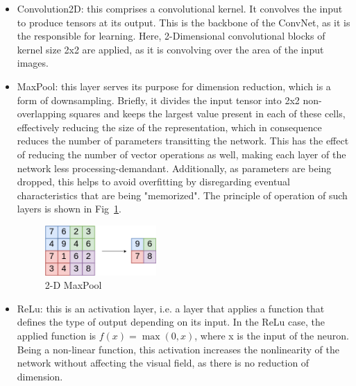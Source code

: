 \begin{itemize}
    \item Convolution2D: this comprises a convolutional kernel. It convolves the input to produce tensors at its output. This is the backbone of the \ac{ConvNet}, as it is the responsible for learning. Here, 2-Dimensional convolutional blocks of kernel size 2x2 are applied, as it is convolving over the area of the input images.
    \item MaxPool: this layer serves its purpose for dimension reduction, which is a form of downsampling. Briefly, it divides the input tensor into 2x2 non-overlapping squares and keeps the largest value present in each of these cells, effectively reducing the size of the representation, which in consequence reduces the number of parameters transitting the network. This has the effect of reducing the number of vector operations as well, making each layer of the network less processing-demandant. Additionally, as parameters are being dropped, this helps to avoid overfitting by disregarding eventual characteristics that are being "memorized". The principle of operation of such layers is shown in Fig~\ref{fig:maxpool}.
        \begin{figure}[!htb]
            \centering
              \includegraphics[width=0.4\textwidth]{figures/maxpool}
              \caption{2-D MaxPool}
              \label{fig:maxpool}
        \end{figure}
    \item \ac{ReLu}: this is an activation layer, i.e. a layer that applies a function that defines the type of output depending on its input. In the \ac{ReLu} case, the applied function is \(f(x) =\max(0,x) \), where x is the input of the neuron. Being a non-linear function, this activation increases the nonlinearity of the network without affecting the visual field, as there is no reduction of dimension.
        \begin{figure}[!htb]
            \centering
\end{figure}
\end{itemize}
